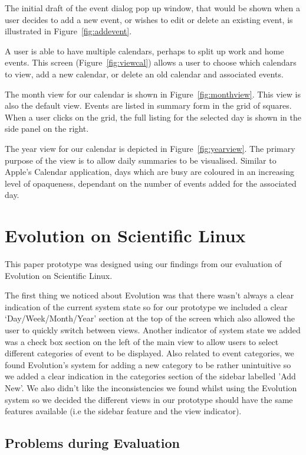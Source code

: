 \documentclass{article}
\begin{document}
The initial draft of the event dialog pop up window, that would be
shown when a user decides to add a new event, or wishes to edit or
delete an existing event, is illustrated in Figure~\ref{fig:addevent}.

A user is able to have multiple calendars, perhaps to split up work and
home events. This screen (Figure~\ref{fig:viewcal}) allows a user to
choose which calendars to view, add a new calendar, or delete an old
calendar and associated events.

The month view for our calendar is shown in Figure~\ref{fig:monthview}.
This view is also the default view. Events are listed in summary form
in the grid of squares. When a user clicks on the grid, the full listing
for the selected day is shown in the side panel on the right.

The year view for our calendar is depicted in Figure~\ref{fig:yearview}.
The primary purpose of the view is to allow daily summaries to be
visualised. Similar to Apple's Calendar application, days which are
busy are coloured in an increasing level of opaqueness, dependant on
the number of events added for the associated day.

\section{Evolution on Scientific Linux}

This paper prototype was designed using our findings from our evaluation 
of Evolution on Scientific Linux.

The first thing we noticed about Evolution was that there wasn't always
a clear indication of the current system state so for our prototype we
included a clear `Day/Week/Month/Year' section at the top of the screen
which also allowed the user to quickly switch between views. Another
indicator of system state we added was a check box section on the left of
the main view to allow users to select different categories of event to
be displayed. Also related to event categories, we found Evolution's
system for adding a new category to be rather unintuitive so we added a
clear indication in the categories section of the sidebar labelled
'Add New'. We also didn't like the inconsistencies we found whilst
using the Evolution system so we decided the different views in our
prototype should have the same features available (i.e the sidebar
feature and the view indicator).

\subsection{Problems during Evaluation}
\end{document}
